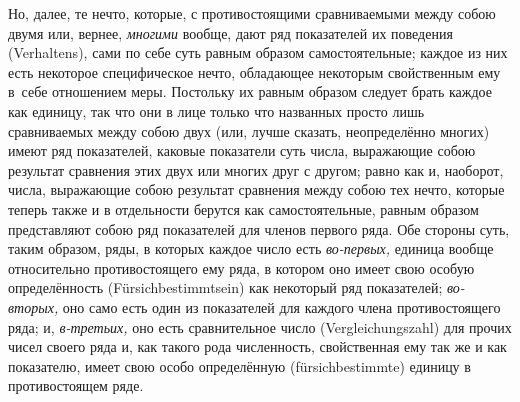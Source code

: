 Но, далее, те нечто, которые, с противостоящими сравниваемыми между собою двумя
или, вернее, {\em многими} вообще, дают ряд показателей их поведения
(Ver\-hal\-tens), сами по себе суть равным образом самостоятельные; каждое из
них есть некоторое специфическое нечто, обладающее некоторым свойственным ему
в~себе отношением меры. Постольку их равным образом следует брать каждое как
единицу, так что они в лице только что названных просто лишь сравниваемых между
собою двух (или, лучше сказать, неопределённо многих) имеют ряд показателей,
каковые показатели суть числа, выражающие собою результат сравнения этих двух
или многих друг с другом; равно как и, наоборот, числа, выражающие собою
результат сравнения между собою тех нечто, которые теперь также и в отдельности
берутся как самостоятельные, равным образом представляют собою ряд показателей
для членов первого ряда. Обе стороны суть, таким образом, ряды, в которых
каждое число есть {\em во-первых,} единица вообще относительно противостоящего
ему ряда, в котором оно имеет свою особую определённость
(Für\-sich\-bes\-timmt\-sein) как некоторый ряд показателей; {\em во-вторых,}
оно само есть один из показателей для каждого члена противостоящего ряда; и,
{\em в-третьих,} оно есть сравнительное число (Ver\-gleich\-ungs\-zahl) для
прочих чисел своего ряда и, как такого рода численность, свойственная ему так
же и как показателю, имеет свою особо определённую (für\-sich\-bes\-timmte)
единицу в противостоящем ряде.


